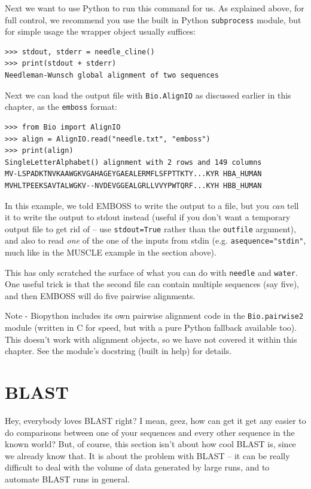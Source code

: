 \documentclass{report}
\begin{document}
Next we want to use Python to run this command for us. As explained above,
for full control, we recommend you use the built in Python \texttt{subprocess}
module, but for simple usage the wrapper object usually suffices:

\begin{verbatim}
>>> stdout, stderr = needle_cline()
>>> print(stdout + stderr)
Needleman-Wunsch global alignment of two sequences
\end{verbatim}

Next we can load the output file with \verb|Bio.AlignIO| as
discussed earlier in this chapter, as the \texttt{emboss} format:

\begin{verbatim}
>>> from Bio import AlignIO
>>> align = AlignIO.read("needle.txt", "emboss")
>>> print(align)
SingleLetterAlphabet() alignment with 2 rows and 149 columns
MV-LSPADKTNVKAAWGKVGAHAGEYGAEALERMFLSFPTTKTY...KYR HBA_HUMAN
MVHLTPEEKSAVTALWGKV--NVDEVGGEALGRLLVVYPWTQRF...KYH HBB_HUMAN
\end{verbatim}

In this example, we told EMBOSS to write the output to a file, but you
\emph{can} tell it to write the output to stdout instead (useful if you
don't want a temporary output file to get rid of -- use
\texttt{stdout=True} rather than the \texttt{outfile} argument), and
also to read \emph{one} of the one of the inputs from stdin (e.g.
\texttt{asequence="stdin"}, much like in the MUSCLE example in the
section above).

This has only scratched the surface of what you can do with \texttt{needle}
and \texttt{water}. One useful trick is that the second file can contain
multiple sequences (say five), and then EMBOSS will do five pairwise
alignments.

Note - Biopython includes its own pairwise alignment code in the \verb|Bio.pairwise2|
module (written in C for speed, but with a pure Python fallback available too). This
doesn't work with alignment objects, so we have not covered it within this chapter.
See the module's docstring (built in help) for details.

\chapter{BLAST}
\label{chapter:blast}
Hey, everybody loves BLAST right? I mean, geez, how can get it get any easier to do comparisons between one of your sequences and every other sequence in the known world? But, of course, this section isn't about how cool BLAST is, since we already know that. It is about the problem with BLAST -- it can be really difficult to deal with the volume of data generated by large runs, and to automate BLAST runs in general.
\end{document}
